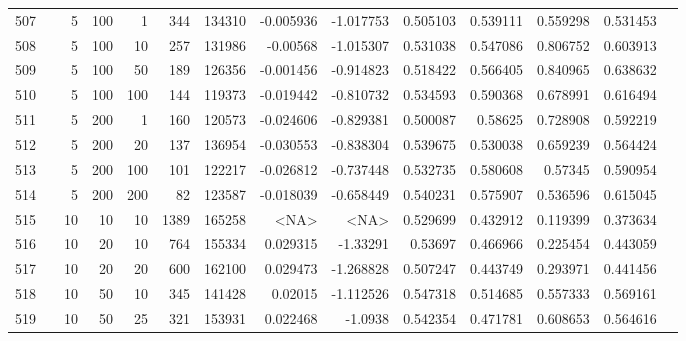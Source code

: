 \begin{longtable}{llrrrrrrrrrrrr}
		507 & &            5 &               100 &            1 &         344 &     134310 & -0.005936 & -1.017753 &  0.505103 &    0.539111 &       0.559298 &  0.531453 \\
		508 & &            5 &               100 &           10 &         257 &     131986 &  -0.00568 & -1.015307 &  0.531038 &    0.547086 &       0.806752 &  0.603913 \\
		509 & &            5 &               100 &           50 &         189 &     126356 & -0.001456 & -0.914823 &  0.518422 &    0.566405 &       0.840965 &  0.638632 \\
		510 & &            5 &               100 &          100 &         144 &     119373 & -0.019442 & -0.810732 &  0.534593 &    0.590368 &       0.678991 &  0.616494 \\
		511 & &            5 &               200 &            1 &         160 &     120573 & -0.024606 & -0.829381 &  0.500087 &     0.58625 &       0.728908 &  0.592219 \\
		512 & &            5 &               200 &           20 &         137 &     136954 & -0.030553 & -0.838304 &  0.539675 &    0.530038 &       0.659239 &  0.564424 \\
		513 & &            5 &               200 &          100 &         101 &     122217 & -0.026812 & -0.737448 &  0.532735 &    0.580608 &        0.57345 &  0.590954 \\
		514 & &            5 &               200 &          200 &          82 &     123587 & -0.018039 & -0.658449 &  0.540231 &    0.575907 &       0.536596 &  0.615045 \\
		515 & &           10 &                10 &           10 &           1389 &     165258 &      <NA> &      <NA> &  0.529699 &    0.432912 &       0.119399 &  0.373634 \\
		516 & &           10 &                20 &           10 &         764 &     155334 &  0.029315 &  -1.33291 &   0.53697 &    0.466966 &       0.225454 &  0.443059 \\
		517 & &           10 &                20 &           20 &         600 &     162100 &  0.029473 & -1.268828 &  0.507247 &    0.443749 &       0.293971 &  0.441456 \\
		518 & &           10 &                50 &           10 &         345 &     141428 &   0.02015 & -1.112526 &  0.547318 &    0.514685 &       0.557333 &  0.569161 \\
		519 & &           10 &                50 &           25 &         321 &     153931 &  0.022468 &   -1.0938 &  0.542354 &    0.471781 &       0.608653 &  0.564616 \\

\end{longtable}
